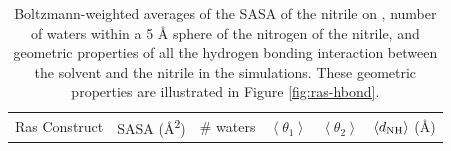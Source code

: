 \begin{table}
    \caption{Boltzmann-weighted averages of the SASA of the nitrile on \RalBSCN{}, number of waters within a 5 \si{\angstrom} sphere of the nitrogen of the nitrile, and geometric properties of all the hydrogen bonding interaction between the solvent and the nitrile in the simulations. These geometric properties are illustrated in Figure \ref{fig:ras-hbond}.}
    \begin{tabular}{cccccc} 
    \toprule
        \rowcolor{lgray}
        Ras Construct & SASA (\si{\angstrom^2})  & \# waters & $\left < \theta_1 \right >$  & $\left < \theta_2 \right >$ & $\left < d_{\rm{NH}} \right >$ (\si{\angstrom}) \\
    
        \cmidrule(r){1-1}\cmidrule(lr){2-2}\cmidrule(lr){3-3}\cmidrule(lr){4-4}\cmidrule(lr){5-5}\cmidrule(l){6-6}
    

\end{tabular}
\end{table}

